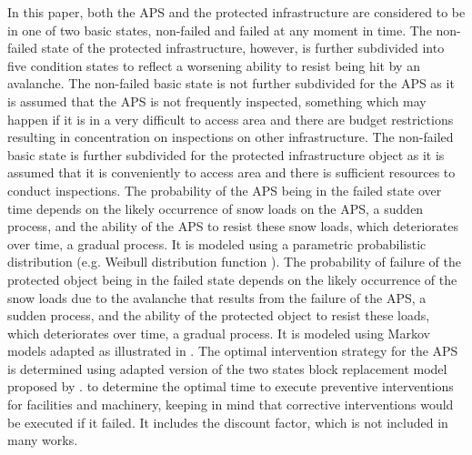 \documentclass[]{article}
\begin{document}
In this paper, both the APS and the protected infrastructure are considered
to be in one of two basic states, non-failed and failed at any moment
in time. The non-failed state of the protected infrastructure, however,
is further subdivided into five condition states to reflect a worsening
ability to resist being hit by an avalanche. The non-failed basic
state is not further subdivided for the APS as it is assumed that
the APS is not frequently inspected, something which may happen if it is in a
very difficult to access area and there are budget restrictions resulting
in concentration on inspections on other infrastructure. The non-failed
basic state is further subdivided for the protected infrastructure
object as it is assumed that it is conveniently to access area and there
is sufficient resources to conduct inspections. The probability of
the APS being in the failed state over time depends on the likely
occurrence of snow loads on the APS, a sudden process, and the ability
of the APS to resist these snow loads, which deteriorates over time,
a gradual process. It is modeled using a parametric probabilistic
distribution (e.g. Weibull distribution function \citep{Dodson2006}).
The probability of failure of the protected object being in the failed
state depends on the likely occurrence of the snow loads due to the
avalanche that results from the failure of the APS, a sudden process,
and the ability of the protected object to resist these loads, which
deteriorates over time, a gradual process. It is modeled using Markov
models adapted as illustrated in \citet{Mayet2002,Lethanh2015}. The
optimal intervention strategy for the APS is determined using adapted
version of the two states block replacement model proposed by \citet{Kaio1984}.
to determine the optimal time to execute preventive interventions
for facilities and machinery, keeping in mind that corrective interventions
would be executed if it failed. It includes the discount factor, which
is not included in many works.
\end{document}
